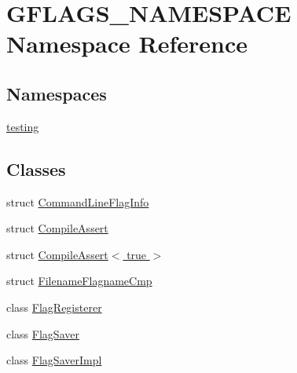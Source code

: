 \hypertarget{namespaceGFLAGS__NAMESPACE}{}\section{G\+F\+L\+A\+G\+S\+\_\+\+N\+A\+M\+E\+S\+P\+A\+CE Namespace Reference}
\label{namespaceGFLAGS__NAMESPACE}
\subsection*{Namespaces}
\begin{DoxyCompactItemize}
\item 
 \hyperlink{namespaceGFLAGS__NAMESPACE_1_1testing}{testing}
\end{DoxyCompactItemize}
\subsection*{Classes}
\begin{DoxyCompactItemize}
\item 
struct \hyperlink{structGFLAGS__NAMESPACE_1_1CommandLineFlagInfo}{Command\+Line\+Flag\+Info}
\item 
struct \hyperlink{structGFLAGS__NAMESPACE_1_1CompileAssert}{Compile\+Assert}
\item 
struct \hyperlink{structGFLAGS__NAMESPACE_1_1CompileAssert_3_01true_01_4}{Compile\+Assert$<$ true $>$}
\item 
struct \hyperlink{structGFLAGS__NAMESPACE_1_1FilenameFlagnameCmp}{Filename\+Flagname\+Cmp}
\item 
class \hyperlink{classGFLAGS__NAMESPACE_1_1FlagRegisterer}{Flag\+Registerer}
\item 
class \hyperlink{classGFLAGS__NAMESPACE_1_1FlagSaver}{Flag\+Saver}
\item 
class \hyperlink{classGFLAGS__NAMESPACE_1_1FlagSaverImpl}{Flag\+Saver\+Impl}
\end{DoxyCompactItemize}
